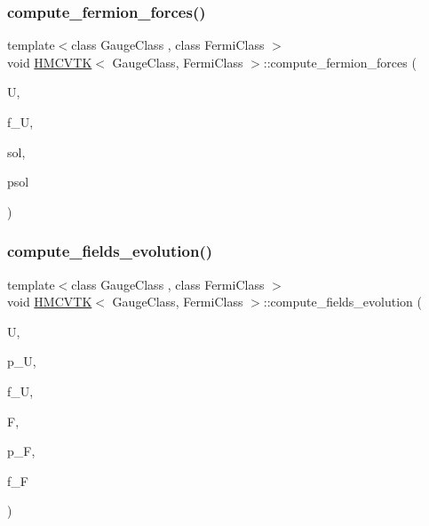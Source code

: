 \mbox{\label{class_h_m_c_v_t_k_a6bd487e5258df0c909fba60c63fe4101}} 
\subsubsection{\texorpdfstring{compute\+\_\+fermion\+\_\+forces()}{compute\_fermion\_forces()}}
{\footnotesize\ttfamily template$<$class Gauge\+Class , class Fermi\+Class $>$ \\
void \hyperlink{class_h_m_c_v_t_k}{H\+M\+C\+V\+TK}$<$ Gauge\+Class, Fermi\+Class $>$\+::compute\+\_\+fermion\+\_\+forces (\begin{DoxyParamCaption}\item[{Gauge\+Class \&}]{U,  }\item[{Gauge\+Class \&}]{f\+\_\+U,  }\item[{Fermi\+Class \&}]{sol,  }\item[{Fermi\+Class \&}]{psol }\end{DoxyParamCaption})\hspace{0.3cm}{\ttfamily [inline]}}

\mbox{\label{class_h_m_c_v_t_k_adc97bfb3acf63780adb9e7af9ae578a7}} 
\subsubsection{\texorpdfstring{compute\+\_\+fields\+\_\+evolution()}{compute\_fields\_evolution()}}
{\footnotesize\ttfamily template$<$class Gauge\+Class , class Fermi\+Class $>$ \\
void \hyperlink{class_h_m_c_v_t_k}{H\+M\+C\+V\+TK}$<$ Gauge\+Class, Fermi\+Class $>$\+::compute\+\_\+fields\+\_\+evolution (\begin{DoxyParamCaption}\item[{Gauge\+Class \&}]{U,  }\item[{Gauge\+Class \&}]{p\+\_\+U,  }\item[{Gauge\+Class \&}]{f\+\_\+U,  }\item[{Fermi\+Class \&}]{F,  }\item[{Fermi\+Class \&}]{p\+\_\+F,  }\item[{Fermi\+Class \&}]{f\+\_\+F }\end{DoxyParamCaption})\hspace{0.3cm}{\ttfamily [inline]}}

